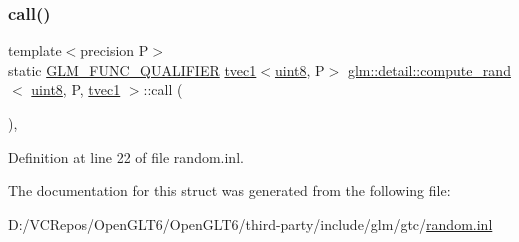 \subsubsection{\texorpdfstring{call()}{call()}}
{\footnotesize\ttfamily template$<$precision P$>$ \\
static \mbox{\hyperlink{setup_8hpp_a33fdea6f91c5f834105f7415e2a64407}{G\+L\+M\+\_\+\+F\+U\+N\+C\+\_\+\+Q\+U\+A\+L\+I\+F\+I\+ER}} \mbox{\hyperlink{structglm_1_1tvec1}{tvec1}}$<$\mbox{\hyperlink{namespaceglm_1_1detail_aef2588f97d090cc19fbbe0c74fe17c8f}{uint8}}, P$>$ \mbox{\hyperlink{structglm_1_1detail_1_1compute__rand}{glm\+::detail\+::compute\+\_\+rand}}$<$ \mbox{\hyperlink{namespaceglm_1_1detail_aef2588f97d090cc19fbbe0c74fe17c8f}{uint8}}, P, \mbox{\hyperlink{structglm_1_1tvec1}{tvec1}} $>$\+::call (\begin{DoxyParamCaption}{ }\end{DoxyParamCaption})\hspace{0.3cm}{\ttfamily [inline]}, {\ttfamily [static]}}



Definition at line 22 of file random.\+inl.



The documentation for this struct was generated from the following file\+:\begin{DoxyCompactItemize}
\item 
D\+:/\+V\+C\+Repos/\+Open\+G\+L\+T6/\+Open\+G\+L\+T6/third-\/party/include/glm/gtc/\mbox{\hyperlink{random_8inl}{random.\+inl}}\end{DoxyCompactItemize}
